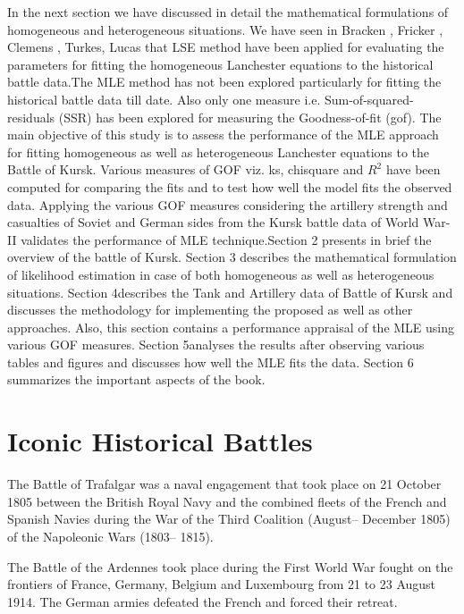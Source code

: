 \documentclass[]{article}
\begin{document}
In the next section we have discussed in detail the mathematical formulations of homogeneous and heterogeneous situations. We have seen in Bracken \autocite{Bracken:1995}, Fricker \autocite{Fricker:1998} , Clemens \autocite{Clemens:1997} , Turkes\autocite{Turkes:2000}, Lucas \autocite{LukasTurkes:2004} that LSE method have been applied for evaluating the parameters for fitting the homogeneous Lanchester equations to the historical battle data.The MLE method \autocite{rohatgi2015introduction,Taylor:1983} has not been explored particularly for fitting the historical battle data till date. Also only one measure i.e. Sum-of-squared-residuals (SSR) has been explored for measuring the Goodness-of-fit (\acrshort{gof}). The main objective of this study is to assess the performance of the MLE approach for fitting homogeneous as well as heterogeneous Lanchester equations to the Battle of Kursk. Various measures of GOF \autocite{Agustino:1986} viz. \acrlong{ks}, \acrlong{chisquare} and $R^2$ have been computed for comparing the fits and to test how well the model fits the observed data. Applying the various GOF measures considering the artillery strength and casualties of Soviet and German sides from the Kursk battle data of World War-II validates the performance of MLE technique.Section 2 presents in brief the \\overview of the battle of Kursk. Section 3 describes the mathematical formulation of likelihood estimation in case of both homogeneous as well as heterogeneous situations. Section 4describes the Tank and Artillery data of Battle of Kursk and discusses the methodology for implementing the proposed as well as other approaches. Also, this section contains a performance appraisal of the MLE using various GOF measures. Section 5analyses the results after observing various tables and figures and discusses how well the MLE fits the data. Section 6 summarizes the important aspects of the book.
\newpage
\section{Iconic Historical Battles}
The Battle of Trafalgar was a naval engagement that took place on 21 October 1805 between the British Royal Navy and the combined fleets of the French and Spanish Navies during the War of the Third Coalition (August–
December 1805) of the Napoleonic Wars (1803– 1815)\cite{BattleOfTrafalgar}.

The Battle of the Ardennes took place during the First World War fought on the frontiers of France, Germany, Belgium and Luxembourg from 21 to 23 August 1914. The German armies defeated the French and forced their retreat. 
\end{document}
